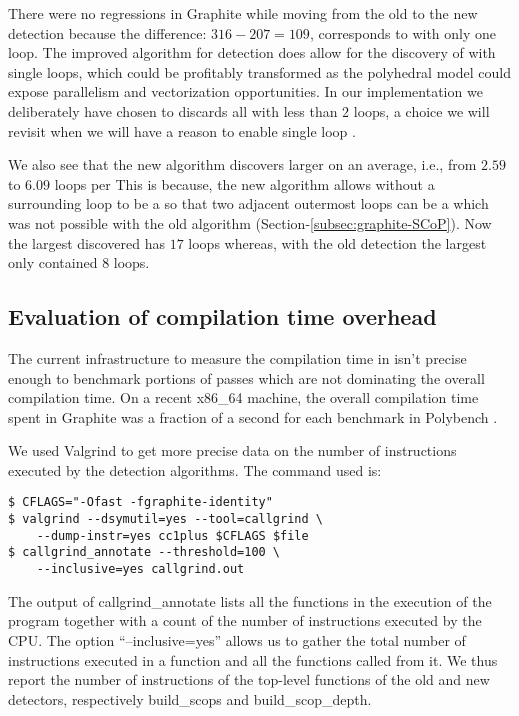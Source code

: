 \documentclass{sig-alternate}
\begin{document}
There were no regressions in Graphite while moving from the old to the new
\SCoP{} detection because the difference: $316 - 207 = 109$, corresponds to
 with only one loop.  The improved algorithm for \SCoP{} detection does
allow for the discovery of  with single loops, which could be profitably
transformed as the polyhedral model could expose parallelism and vectorization
opportunities.  In our implementation we deliberately have chosen to discards
all  with less than $2$ loops, a choice we will revisit when we will
have a reason to enable single loop .

We also see that the new algorithm discovers larger  on an average,
i.e., from $2.59$ to $6.09$ loops per  This is because, the new
algorithm allows \SESE{} without a surrounding loop to be a \SCoP{} so that two
adjacent outermost loops can be a \SCoP{,} which was not possible with the old algorithm
(Section-\ref{subsec:graphite-SCoP}). Now the largest \SCoP{} discovered has $17$
loops whereas, with the old \SCoP{} detection the largest \SCoP{} only contained $8$ loops.

\subsection{Evaluation of compilation time overhead}
The current infrastructure to measure the compilation time in \GCC{} isn't precise
enough to benchmark portions of passes which are not dominating the overall
compilation time.  On a recent x86\_64 machine, the overall compilation time
spent in Graphite was a fraction of a second for each benchmark
in Polybench \cite{polybench}.

We used Valgrind to get more precise data on the number of instructions executed
by the \SCoP{} detection algorithms.  The command used is:
\begin{verbatim}
$ CFLAGS="-Ofast -fgraphite-identity"
$ valgrind --dsymutil=yes --tool=callgrind \
    --dump-instr=yes cc1plus $CFLAGS $file
$ callgrind_annotate --threshold=100 \
    --inclusive=yes callgrind.out
\end{verbatim}

The output of callgrind\_annotate lists all the functions in the execution of
the program together with a count of the number of instructions executed by the
CPU.  The option ``--inclusive=yes'' allows us to gather the total number of
instructions executed in a function and all the functions called from it.  We
thus report the number of instructions of the top-level functions of the old and
new \SCoP{} detectors, respectively build\_scops and build\_scop\_depth.
\end{document}
